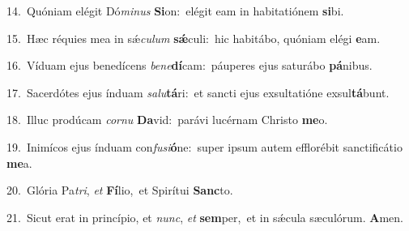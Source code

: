 {\numbfont\textcolor{\numbcolor}{14.}}~Quóniam elégit Dó\-\textit{mi}\-\textit{nus} \textbf{Si}\-on:~\star elégit eam in habitatiónem \textbf{si}\-bi.\par
{\numbfont\textcolor{\numbcolor}{15.}}~Hæc réquies mea in sǽ\-\textit{cu}\-\textit{lum} \textbf{sǽ}\-culi:~\star hic habitábo, quóniam elégi \textbf{e}\-am.\par
{\numbfont\textcolor{\numbcolor}{16.}}~Víduam ejus benedícens \textit{be}\-\textit{ne}\textbf{dí}cam:~\star páuperes ejus saturábo \textbf{pá}\-nibus.\par
{\numbfont\textcolor{\numbcolor}{17.}}~Sacerdótes ejus índuam \textit{sa}\-\textit{lu}\textbf{tá}ri:~\star et sancti ejus exsultatióne exsul\-\textbf{tá}\-bunt.\par
{\numbfont\textcolor{\numbcolor}{18.}}~Illuc prodúcam \textit{cor}\-\textit{nu} \textbf{Da}\-vid:~\star parávi lucérnam Christo \textbf{me}\-o.\par
{\numbfont\textcolor{\numbcolor}{19.}}~Inimícos ejus índuam con\-\textit{fu}\-\textit{si}\textbf{ó}ne:~\star super ipsum autem efflorébit sanctificátio \textbf{me}\-a.\par
{\numbfont\textcolor{\numbcolor}{20.}}~Glória Pa\-\textit{tri}\-, \textit{et} \textbf{Fí}\-lio,~\star et Spirítui \textbf{Sanc}\-to.\par
{\numbfont\textcolor{\numbcolor}{21.}}~Sicut erat in princípio, et \textit{nunc}\-, \textit{et} \textbf{sem}\-per,~\star et in sǽcula sæculórum. \textbf{A}\-men.\par

